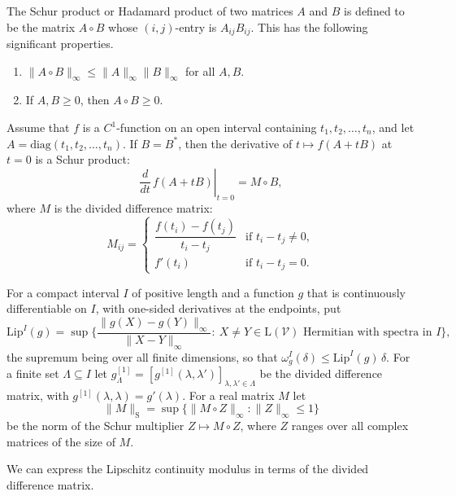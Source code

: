 \begin{definition}
    The Schur product or Hadamard product of two matrices $A$ and $B$ is
defined to be the matrix $A \circ B$ whose $(i,j)$-entry is
$A_{ij}B_{ij}$. This has the following significant properties.
\begin{enumerate}
    \item $\|A \circ B\|_\infty \leq \|A\|_\infty\|B\|_\infty$ for all $A,B$.
    \item If $A,B \geq 0$, then $A \circ B \geq 0$.
\end{enumerate}
\end{definition}

\begin{theorem}
Assume that $f$ is a $C^1$-function on an open interval containing $t_1,t_2,\dots,t_n$, and let
$A=\mathrm{diag}(t_1,t_2,\dots,t_n)$.
If $B=B^*$, then the derivative of $t\mapsto f(A+tB)$ at $t=0$ is a Schur product:
\begin{equation}
  \left.\frac{d}{dt}\, f(A+tB)\right|_{t=0} = M\circ B,
\end{equation}
where $M$ is the divided difference matrix:
\[
  M_{ij}=
  \begin{cases}
    \dfrac{f(t_i)-f(t_j)}{t_i-t_j} & \text{if } t_i-t_j\neq 0,\\[2ex]
    f'(t_i) & \text{if } t_i-t_j=0.
  \end{cases}
\]
\end{theorem}

 
For a compact interval $I$ of positive length and a function $g$ that is continuously differentiable on $I$, with one-sided derivatives at the endpoints, put
\[
\mathrm{Lip}^I(g)=\sup\Big\{\frac{\|g(X)-g(Y)\|_\infty}{\|X-Y\|_\infty}:\ X\neq Y\in\mathrm{L}(\mathcal{V})\text{ Hermitian with spectra in }I\Big\},
\]
the supremum being over all finite dimensions, so that $\omega^I_g(\delta)\leq\mathrm{Lip}^I(g)\,\delta$. For a finite set $\Lambda\subseteq I$ let $g^{[1]}_\Lambda=[g^{[1]}(\lambda,\lambda')]_{\lambda,\lambda'\in\Lambda}$ be the divided difference matrix, with $g^{[1]}(\lambda,\lambda)=g'(\lambda)$. For a real matrix $M$ let
\[
\|M\|_{\mathrm S}=\sup\{\|M\circ Z\|_\infty:\|Z\|_\infty\leq1\}
\]
be the norm of the Schur multiplier $Z\mapsto M\circ Z$, where $Z$ ranges over all complex matrices of the size of $M$.

We can express the Lipschitz continuity modulus in terms of the divided difference matrix.

